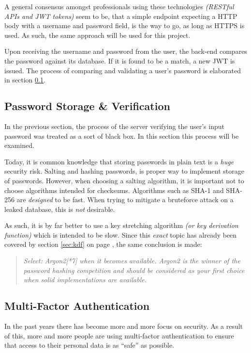 			A general consensus amongst professionals using these technologies \emph{(RESTful APIs and JWT tokens)} seem to be, that a simple endpoint expecting a HTTP body with a username and password field, is the way to go, as long as HTTPS is used\cite{jwt.io,auth0_jwt,tkalec}. As such, the same approach will be used for this project.

			Upon receiving the username and password from the user, the back-end compares the password against its database. If it is found to be a match, a new JWT is issued. The process of comparing and validating a user's password is elaborated in section \ref{sec:password}.


		\subsection{Password Storage \& Verification}
			\label{sec:password}
			In the previous section, the process of the server verifying the user's input password was treated as a sort of black box. In this section this process will be examined.

			Today, it is common knowledge that storing passwords in plain text is a \emph{huge} security risk. Salting and hashing passwords, is proper way to implement storage of passwords. However, when choosing a salting algorithm, it is important not to choose algorithms intended for checksums. Algorithms such as SHA-1 and SHA-256 are \emph{designed} to be fast. When trying to mitigate a bruteforce attack on a leaked database, this is \emph{not} desirable.

			As such, it is by far better to use a key stretching algorithm \emph{(or key derivation function)} which is intended to be slow. Since this \emph{exact} topic has already been covered by section \ref{sec:kdf} on page \pageref{sec:kdf}, the same conclusion is made:

			\begin{quote}
				\emph{Select:
					Argon2[*7] when it becomes available. Argon2 is the winner of the password hashing competition and should be considered as your first choice when solid implementations are available.
				}\\\cite{owasp_kdf}
			\end{quote}

		\subsection{Multi-Factor Authentication}
			\label{sec:mfa}
			In the past years there has become more and more focus on security. As a result of this, more and more people are using multi-factor authentication to ensure that access to their personal data is as ``safe'' as possible. 

